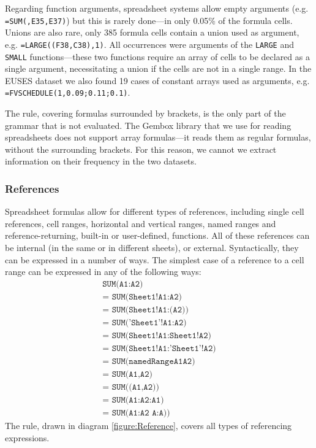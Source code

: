 \documentclass[conference]{IEEEtran}
\begin{document}
Regarding function arguments, spreadsheet systems allow empty arguments (e.g. \texttt{=SUM(,E35,E37)}) but this is rarely done---in only 0.05\% of the formula cells. Unions are also rare, only 385 formula cells contain a union used as argument, e.g. \texttt{=LARGE((F38,C38),1)}. All occurrences were arguments of the \texttt{LARGE} and \texttt{SMALL} functions---these two functions require an array of cells to be declared as a single argument, necessitating a union if the cells are not in a single range. In the EUSES dataset we also found 19 cases of constant arrays used as arguments, e.g. \texttt{=FVSCHEDULE(1,{0.09;0.11;0.1})}.

The  rule, covering formulas surrounded by brackets, is the only part of the grammar that is not evaluated. The Gembox library that we use for reading spreadsheets does not support array formulas---it reads them as regular formulas, without the surrounding brackets. For this reason, we cannot we extract information on their frequency in the two datasets.

\subsubsection{References}

Spreadsheet formulas allow for different types of references, including single cell references, cell ranges, horizontal and vertical ranges, named ranges and reference-returning, built-in or user-defined, functions. All of these references can be internal (in the same or in different sheets), or external. Syntactically, they can be expressed in a number of ways. The simplest case of a reference to a cell range can be expressed in any of the following ways:
\begin{align}
	\texttt{SUM(A1:A2)} \\ 
	\texttt{= SUM(Sheet1!A1:A2)} \\
	\texttt{= SUM(Sheet1!A1:(A2))} \\
	\texttt{= SUM('Sheet1'!A1:A2)} \\
	\texttt{= SUM(Sheet1!A1:Sheet1!A2)} \\
	\texttt{= SUM(Sheet1!A1:'Sheet1'!A2)} \\
	\texttt{= SUM(namedRangeA1A2)} \\ 
	\texttt{= SUM(A1,A2)} \\ 
	\texttt{= SUM((A1,A2))} \\ 
	\texttt{= SUM(A1:A2:A1)} \\
	\texttt{= SUM(A1:A2 A:A))} 
\end{align}
The  rule, drawn in diagram \ref{figure:Reference}, covers all types of referencing expressions.
\end{document}
